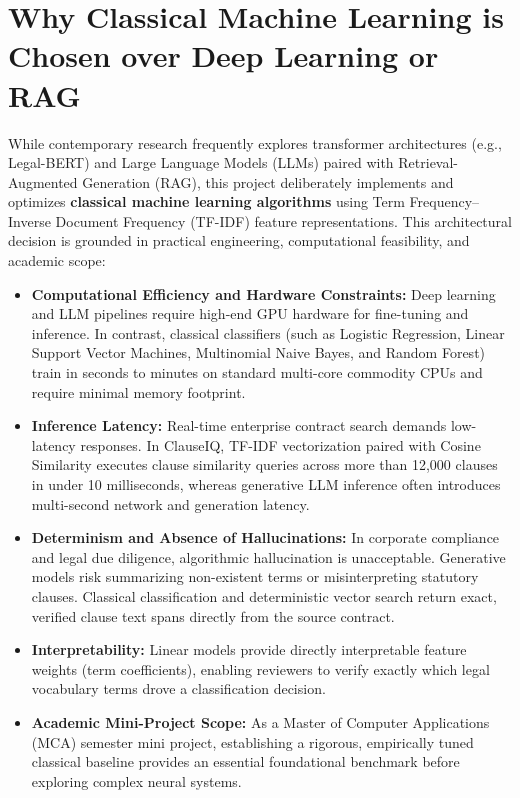 \section*{Why Classical Machine Learning is Chosen over Deep Learning or RAG}
\label{sec:classical_ml_justification}
While contemporary research frequently explores transformer architectures (e.g., Legal-BERT) and Large Language Models (LLMs) paired with Retrieval-Augmented Generation (RAG), this project deliberately implements and optimizes \textbf{classical machine learning algorithms} using Term Frequency--Inverse Document Frequency (TF-IDF) feature representations. This architectural decision is grounded in practical engineering, computational feasibility, and academic scope:
\begin{itemize}
    \item \textbf{Computational Efficiency and Hardware Constraints:} Deep learning and LLM pipelines require high-end GPU hardware for fine-tuning and inference. In contrast, classical classifiers (such as Logistic Regression, Linear Support Vector Machines, Multinomial Naive Bayes, and Random Forest) train in seconds to minutes on standard multi-core commodity CPUs and require minimal memory footprint.
    \item \textbf{Inference Latency:} Real-time enterprise contract search demands low-latency responses. In ClauseIQ, TF-IDF vectorization paired with Cosine Similarity executes clause similarity queries across more than 12,000 clauses in under 10 milliseconds, whereas generative LLM inference often introduces multi-second network and generation latency.
    \item \textbf{Determinism and Absence of Hallucinations:} In corporate compliance and legal due diligence, algorithmic hallucination is unacceptable. Generative models risk summarizing non-existent terms or misinterpreting statutory clauses. Classical classification and deterministic vector search return exact, verified clause text spans directly from the source contract.
    \item \textbf{Interpretability:} Linear models provide directly interpretable feature weights (term coefficients), enabling reviewers to verify exactly which legal vocabulary terms drove a classification decision.
    \item \textbf{Academic Mini-Project Scope:} As a Master of Computer Applications (MCA) semester mini project, establishing a rigorous, empirically tuned classical baseline provides an essential foundational benchmark before exploring complex neural systems.
\end{itemize}

